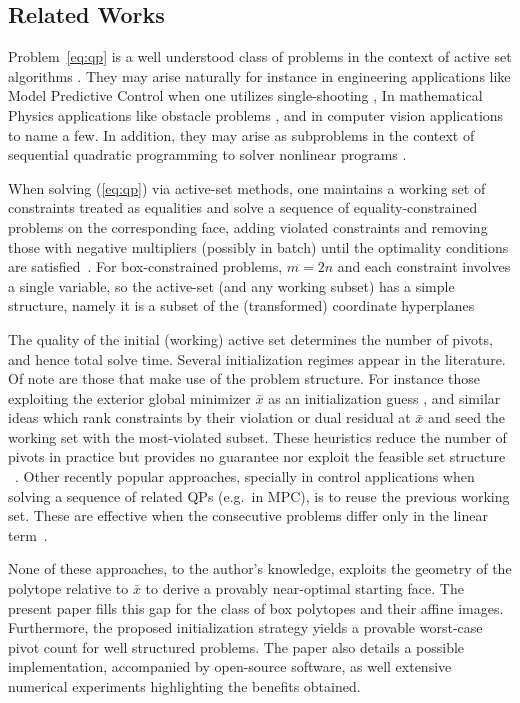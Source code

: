 \documentclass[pdflatex,sn-mathphys-num]{sn-jnl}%
\theoremstyle{thmstyleone}%
\theoremstyle{thmstyletwo}%
\theoremstyle{thmstylethree}%
\theoremstyle{thmstylethree}%
\begin{document}
\subsection{Related Works}\label{sec:literature}
 Problem~\ref{eq:qp} is a well understood class of problems in the context of active set algorithms \citep{box_1, box_2, box_3}. They may arise naturally for instance in engineering applications like Model Predictive Control when one utilizes single-shooting \cite{mpc_box}, In mathematical Physics applications like obstacle problems \cite{box_5, obstacle_problems}, and in computer vision applications \cite{face_rec} to name a few. In addition, they may arise as subproblems in the context of sequential quadratic programming to solver nonlinear programs \cite{box_4}.

When solving (\ref{eq:qp}) via active-set methods, one  maintains a working set of
constraints treated as equalities and solve a sequence of equality-constrained problems on the
corresponding face, adding violated constraints and removing those with negative multipliers (possibly in batch) until the optimality conditions are satisfied~\cite{nocedal2006numerical}.
For box-constrained problems, $m=2n$ and each constraint involves a single variable, so the active-set (and any working subset) has a simple structure, namely it is a subset of the (transformed) coordinate hyperplanes

The quality of the initial (working) active set determines the number of pivots, and hence total solve time.
Several initialization regimes appear in the literature. Of note are those that make use of the problem structure. For instance those exploiting the exterior global minimizer $\bar x$ as an initialization guess \citep{dax, goldfarb1983numerically}, and similar ideas which rank constraints by their violation or dual residual at
$\bar{x}$ and seed the working set with the most-violated subset. These heuristics reduce the number of pivots in practice
but provides no guarantee nor exploit the feasible set structure ~\cite{goldfarb1983numerically}. Other recently popular approaches, specially in control applications when solving a sequence of related QPs
(e.g.\ in MPC), is to reuse the previous working set. These are effective when the consecutive problems differ only in the linear term~\cite{mpc_box}.

None of these approaches, to the author's knowledge, exploits the geometry of the polytope relative to $\bar{x}$ to derive a provably near-optimal starting face. The present paper fills this gap for the class of box polytopes and their affine images. Furthermore, the proposed initialization strategy yields  a provable worst-case pivot count for well structured problems. The paper also details a possible implementation, accompanied by open-source software, as well extensive numerical experiments highlighting the benefits obtained. 
\end{document}
